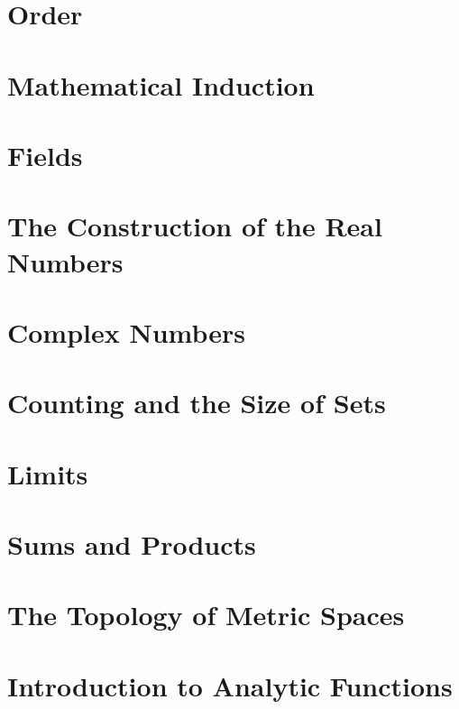 \documentclass{report}
\begin{document}
\chapter{Order}
\chapter{Mathematical Induction}
\chapter{Fields}
\chapter{The Construction of the Real Numbers}
\chapter{Complex Numbers}
\chapter{Counting and the Size of Sets}
\chapter{Limits}
\chapter{Sums and Products}
\chapter{The Topology of Metric Spaces}
\chapter{Introduction to Analytic Functions}
\end{document}
